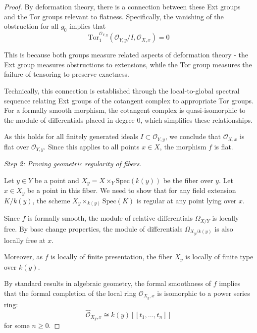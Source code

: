 \documentclass[12pt]{article}
\begin{document}
\begin{proof}
    \medskip
    \noindent By deformation theory, there is a connection between these Ext groups and the Tor groups relevant to flatness. Specifically, the vanishing of the obstruction for all $g_0$ implies that
    \begin{equation}
        \text{Tor}_1^{\mathcal{O}_{Y,y}}(\mathcal{O}_{Y,y}/I, \mathcal{O}_{X,x}) = 0
    \end{equation}

    \noindent This is because both groups measure related aspects of deformation theory - the Ext group measures obstructions to extensions, while the Tor group measures the failure of tensoring to preserve exactness.

    \medskip
    \noindent Technically, this connection is established through the local-to-global spectral sequence relating Ext groups of the cotangent complex to appropriate Tor groups. For a formally smooth morphism, the cotangent complex is quasi-isomorphic to the module of differentials placed in degree 0, which simplifies these relationships.

    \medskip
    \noindent As this holds for all finitely generated ideals $I \subset \mathcal{O}_{Y,y}$, we conclude that $\mathcal{O}_{X,x}$ is flat over $\mathcal{O}_{Y,y}$. Since this applies to all points $x \in X$, the morphism $f$ is flat.



    
    \medskip
    \noindent \textit{Step 2: Proving geometric regularity of fibers.}

    \medskip
    \noindent Let $y \in Y$ be a point and $X_y = X \times_Y \text{Spec}(k(y))$ be the fiber over $y$. Let $x \in X_y$ be a point in this fiber. We need to show that for any field extension $K/k(y)$, the scheme $X_y \times_{k(y)} \text{Spec}(K)$ is regular at any point lying over $x$.

    \medskip
    \noindent Since $f$ is formally smooth, the module of relative differentials $\Omega_{X/Y}$ is locally free. By base change properties, the module of differentials $\Omega_{X_y/k(y)}$ is also locally free at $x$.

    \medskip
    \noindent Moreover, as $f$ is locally of finite presentation, the fiber $X_y$ is locally of finite type over $k(y)$.

    \medskip
    \noindent By standard results in algebraic geometry, the formal smoothness of $f$ implies that the formal completion of the local ring $\mathcal{O}_{X_y,x}$ is isomorphic to a power series ring:
    \begin{equation}
        \hat{\mathcal{O}}_{X_y,x} \cong k(y)[[t_1, \ldots, t_n]]
    \end{equation}
    for some $n \geq 0$.


\end{proof}
\end{document}
